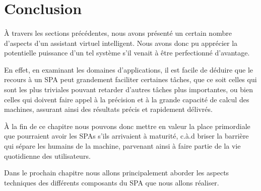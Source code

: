 %
\section{Conclusion}
\paragraph{}
À travers les sections précédentes, nous avons présenté un certain nombre d'aspects d'un assistant virtuel intelligent. Nous avons donc pu apprécier la potentielle puissance d'un tel système s'il venait à être perfectionné d'avantage.
\par En effet, en examinant les domaines d'applications, il est facile de déduire que le recours à un SPA peut grandement faciliter certaines tâches, que ce soit celles qui sont les plus triviales pouvant retarder d'autres tâches plus importantes, ou bien celles qui doivent faire appel à la précision et à la grande capacité de calcul des machines, assurant ainsi des résultats précis et rapidement délivrés.
\par
À la fin de ce chapitre nous pouvons donc mettre en valeur la place primordiale que pourraient avoir les SPAs s'ils arrivaient à maturité, c.à.d briser la barrière qui sépare les humains de la machine, parvenant ainsi à faire partie de la vie quotidienne des utilisateurs. 
\par Dans le prochain chapitre nous allons principalement aborder les aspects techniques des différents composants du SPA que nous allons réaliser.

 
